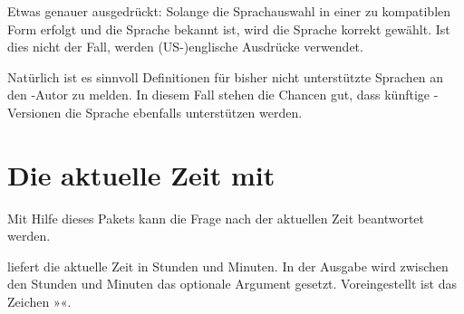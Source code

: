\begin{Explain}
  Etwas genauer ausgedrückt: Solange die Sprachauswahl in einer zu
   kompatiblen Form erfolgt und die Sprache
   bekannt ist, wird die Sprache korrekt gewählt. Ist dies
  nicht der Fall, werden (US-)englische Ausdrücke verwendet.
\end{Explain}

Natürlich ist es sinnvoll Definitionen für bisher nicht unterstützte Sprachen
an den \KOMAScript-Autor zu melden. In diesem Fall stehen die Chancen gut,
dass künftige \KOMAScript-Versionen die Sprache ebenfalls unterstützen
werden.%
\EndIndexGroup
%
\EndIndexGroup


\chapter{Die aktuelle Zeit mit }
\BeginIndexGroup
{}

Mit Hilfe dieses Pakets kann die Frage nach der aktuellen Zeit beantwortet
werden.%
\iffalse %
\ Seit Version~3.05 unterstützt das Paket auch die von den
\KOMAScript-Klassen und diversen anderen \KOMAScript-Paketen bekannten
Möglichkeiten zur Angabe von Optionen. Siehe dazu beispielsweise
\autoref{sec:typearea.options}.%
\fi

\begin{Declaration}%
\end{Declaration}%
 liefert die aktuelle Zeit in Stunden und
Minuten. In der Ausgabe wird zwischen den Stunden und Minuten das optionale
Argument  gesetzt. Voreingestellt ist das Zeichen
»\PValue{:}«.

